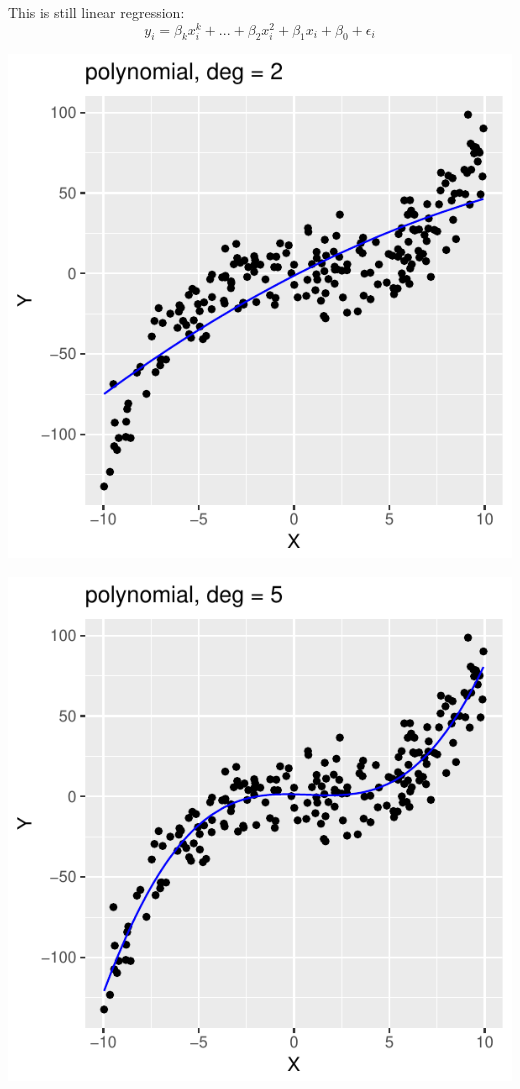 \begin{frame}
\begin{analysis}

\bigskip

This is still linear regression:
$$ y_i = \beta_k x^k_{i} + ... + \beta_2 x^2_{i} + \beta_1 x_{i}  + \beta_0 + \epsilon_i$$

\smallskip

\bigskip

\begin{minipage}[c]{0.24\linewidth}
\includegraphics[width=1.0\linewidth]{../LectureAssets/L04/SimpleRegCV2}
\end{minipage} 
\begin{minipage}[c]{0.24\linewidth}
\includegraphics[width=1.0\linewidth]{../LectureAssets/L04/SimpleRegCV5}

\end{minipage}
\end{analysis}
\end{frame}
